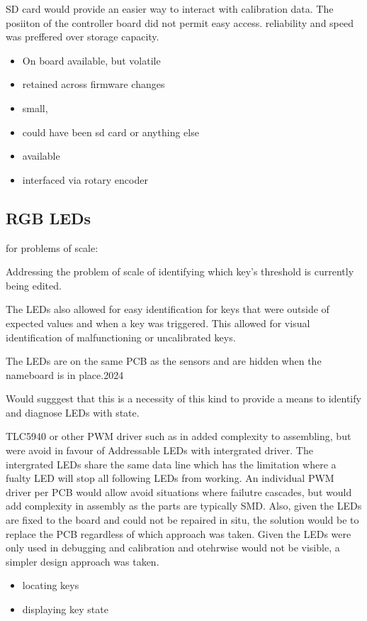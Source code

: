 SD card would provide an easier way to interact with calibration data.
The posiiton of the controller board did not permit easy access.
reliability and speed was preffered over storage capacity.

\begin{itemize}
\item
  On board available, but volatile
\item
  retained across firmware changes
\item
  small,
\item
  could have been sd card or anything else
\item
  available
\item
  interfaced via rotary encoder
\end{itemize}

\subsection{RGB LEDs}\label{rgb-leds}

for problems of scale:

Addressing the problem of scale of identifying which key's threshold is
currently being edited.

The LEDs also allowed for easy identification for keys that were outside
of expected values and when a key was triggered. This allowed for visual
identification of malfunctioning or uncalibrated keys.

The LEDs are on the same PCB as the sensors and are hidden when the
nameboard is in place.2024

Would sugggest that this is a necessity of this kind to provide a means
to identify and diagnose LEDs with state.

TLC5940 or other PWM driver such as in \cite{McPherson2013} added
complexity to assembling, but were avoid in favour of Addressable LEDs
with intergrated driver. The intergrated LEDs share the same data line
which has the limitation where a fualty LED will stop all following LEDs
from working. An individual PWM driver per PCB would allow avoid
situations where failutre cascades, but would add complexity in assembly
as the parts are typically SMD. Also, given the LEDs are fixed to the
board and could not be repaired in situ, the solution would be to
replace the PCB regardless of which approach was taken. Given the LEDs
were only used in debugging and calibration and otehrwise would not be
visible, a simpler design approach was taken.

\begin{itemize}
\item
  locating keys
\item
  displaying key state
\end{itemize}


